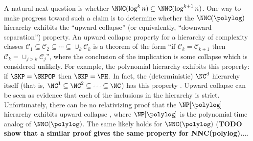\documentclass{article}
\begin{document}
A natural next question is whether $\NNC(\log^k n) \subsetneq \NNC(\log^{k + 1} n)$.
One way to make progress toward such a claim is to determine whether the $\NNC(\polylog)$ hierarchy exhibits the ``upward collapse'' (or equivalently, ``downward separation'') property.
An upward collapse property for a hierarchy of complexity classes $\mathcal{C}_1 \subseteq \mathcal{C}_2 \subseteq \dotsb \subseteq \cup_k \mathcal{C}_k$ is a theorem of the form ``if $\mathcal{C}_k = \mathcal{C}_{k + 1}$ then $\mathcal{C}_k = \cup_{j > k} \mathcal{C}_j$'', where the conclusion of the implication is some collapse which is considered unlikely.
For example, the polynomial hierarchy exhibits this property: if $\SKP = \SKPOP$ then $\SKP = \PH$.
In fact, the (deterministic) $\NC^d$ hierarchy itself (that is, $\NC^1 \subseteq \NC^2 \subseteq \dotsb \subseteq \NC$) has this property \cite[Corollary~5]{wilson89}.
Upward collapse can be seen as evidence that each of the inclusions in the hierarchy is strict.
Unfortunately, there can be no relativizing proof that the $\NP[\polylog]$ hierarchy exhibits upward collapse \cite{bg94}, where $\NP[\polylog]$ is the polynomial time analog of $\NNC(\polylog)$.
The same likely holds for $\NNC(\polylog)$ (\textbf{TODO show that a similar proof gives the same property for NNC(polylog).}...
\end{document}
